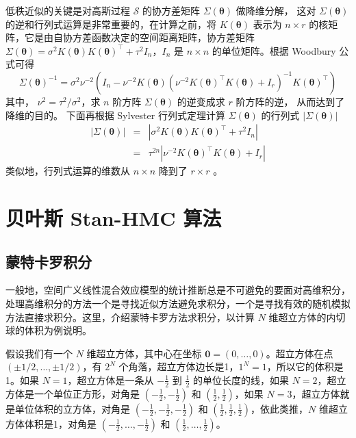 \documentclass[12pt,a4paper,UTF8,twoside]{book}
\theoremstyle{definition}
\theoremstyle{definition}
\theoremstyle{definition}
\theoremstyle{remark}
\begin{document}
低秩近似的关键是对高斯过程 \(\mathcal{S}\) 的协方差矩阵 \(\Sigma(\boldsymbol{\theta})\) 做降维分解， 这对 \(\Sigma(\boldsymbol{\theta})\) 的逆和行列式运算是非常重要的，在计算之前，将 \(K(\boldsymbol{\theta})\) 表示为 \(n\times r\) 的核矩阵，它是由自协方差函数决定的空间距离矩阵，协方差矩阵 \(\Sigma(\boldsymbol{\theta}) = \sigma^2K(\boldsymbol{\theta})K(\boldsymbol{\theta})^{\top}+\tau^2 I_{n}\)，\(I_{n}\) 是 \(n\times n\) 的单位矩阵。根据 Woodbury 公式可得 \[\Sigma(\boldsymbol{\theta})^{-1} = \sigma^2\nu^{-2}(I_{n}-\nu^{-2}K(\boldsymbol{\theta})(\nu^{-2}K(\boldsymbol{\theta})^{\top} K(\boldsymbol{\theta})+I_{r})^{-1}K(\boldsymbol{\theta})^{\top})\] 其中， \(\nu^2 = \tau^2/\sigma^2\)，求 \(n\) 阶方阵 \(\Sigma(\boldsymbol{\theta})\) 的逆变成求 \(r\) 阶方阵的逆， 从而达到了降维的目的。 下面再根据 Sylvester 行列式定理计算 \(\Sigma(\boldsymbol{\theta})\) 的行列式 \(|\Sigma(\boldsymbol{\theta})|\)
\begin{eqnarray*}
|\Sigma(\boldsymbol{\theta})| & = & |\sigma^2K(\boldsymbol{\theta})K(\boldsymbol{\theta})^{\top}+\tau^2 I_{n}| \\ 
                 & = & \tau^{2n}|\nu^{-2}K(\boldsymbol{\theta})^{\top} K(\boldsymbol{\theta})+I_{r}|
\end{eqnarray*}
\noindent 类似地，行列式运算的维数从 \(n\times n\) 降到了 \(r\times r\) \citep{Diggle2007}。

\hypertarget{sec:stan-hmc}{%
\section{贝叶斯 Stan-HMC 算法}\label{sec:stan-hmc}}

\hypertarget{subsec:Curse-of-Dimensionality}{%
\subsection{蒙特卡罗积分}\label{subsec:Curse-of-Dimensionality}}

一般地，空间广义线性混合效应模型的统计推断总是不可避免的要面对高维积分，处理高维积分的方法一个是寻找近似方法避免求积分，一个是寻找有效的随机模拟方法直接求积分。这里，介绍蒙特卡罗方法求积分，以计算 \(N\) 维超立方体的内切球的体积为例说明。

假设我们有一个 \(N\) 维超立方体，其中心在坐标 \(\mathbf{0} = (0,\ldots,0)\)。超立方体在点 \((\pm 1/2,\ldots,\pm 1/2)\)，有 \(2^{N}\) 个角落，超立方体边长是1，\(1^{N}=1\)，所以它的体积是1。如果 \(N=1\)，超立方体是一条从 \(-\frac{1}{2}\) 到 \(\frac{1}{2}\) 的单位长度的线，如果 \(N=2\)，超立方体是一个单位正方形，对角是 \(\left( -\frac{1}{2}, -\frac{1}{2} \right)\) 和 \(\left( \frac{1}{2}, \frac{1}{2} \right)\)，如果 \(N=3\)，超立方体就是单位体积的立方体，对角是 \(\left( -\frac{1}{2}, -\frac{1}{2}, -\frac{1}{2} \right)\) 和 \(\left( \frac{1}{2}, \frac{1}{2}, \frac{1}{2} \right)\)，依此类推，\(N\) 维超立方体体积是1，对角是 \(\left( -\frac{1}{2}, \ldots, -\frac{1}{2} \right)\) 和 \(\left( \frac{1}{2}, \ldots, \frac{1}{2} \right)\)。
\end{document}

